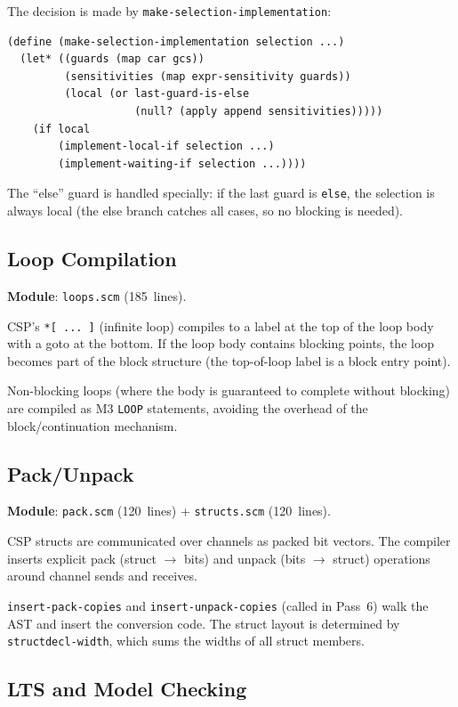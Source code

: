 \documentclass[11pt,letterpaper]{article}
\begin{document}
The decision is made by \texttt{make-selection-implementation}:

\begin{lstlisting}
(define (make-selection-implementation selection ...)
  (let* ((guards (map car gcs))
         (sensitivities (map expr-sensitivity guards))
         (local (or last-guard-is-else
                    (null? (apply append sensitivities)))))
    (if local
        (implement-local-if selection ...)
        (implement-waiting-if selection ...))))
\end{lstlisting}

The ``else'' guard is handled specially: if the last guard is
\texttt{else}, the selection is always local (the else branch
catches all cases, so no blocking is needed).

\subsection{Loop Compilation}

\textbf{Module}: \texttt{loops.scm} (185~lines).

CSP's \texttt{*[~...~]} (infinite loop) compiles to a label at the
top of the loop body with a goto at the bottom.  If the loop body
contains blocking points, the loop becomes part of the block
structure (the top-of-loop label is a block entry point).

Non-blocking loops (where the body is guaranteed to complete without
blocking) are compiled as M3 \texttt{LOOP} statements, avoiding
the overhead of the block/continuation mechanism.

\subsection{Pack/Unpack}

\textbf{Module}: \texttt{pack.scm} (120~lines) +
\texttt{structs.scm} (120~lines).

CSP structs are communicated over channels as packed bit vectors.
The compiler inserts explicit pack (struct $\to$ bits) and unpack
(bits $\to$ struct) operations around channel sends and receives.

\texttt{insert-pack-copies} and \texttt{insert-unpack-copies}
(called in Pass~6) walk the AST and insert the conversion code.
The struct layout is determined by \texttt{structdecl-width}, which
sums the widths of all struct members.

\subsection{LTS and Model Checking}
\end{document}
